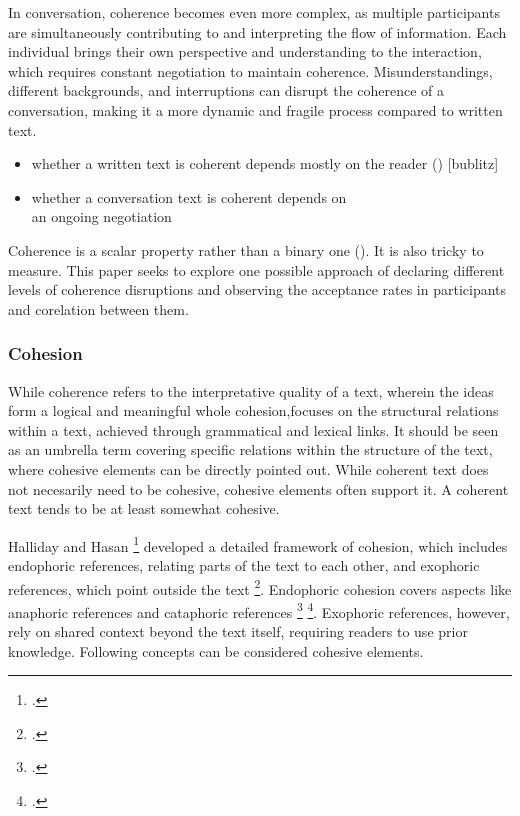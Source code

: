 \documentclass[12pt]{report}
\begin{document}
{\par
    In conversation, coherence becomes even more complex,
    as multiple participants are simultaneously contributing to and interpreting the flow of information.
    Each individual brings their own perspective and understanding to the interaction,
    which requires constant negotiation to maintain coherence.
    Misunderstandings, different backgrounds, and interruptions
    can disrupt the coherence of a conversation,
    making it a more dynamic and fragile process compared to written text.

\begin{itemize}
\item
whether a written text is coherent depends mostly on the reader () [bublitz]
\item
whether a conversation text is coherent depends on\\ an ongoing negotiation
\end{itemize}

\par
    Coherence is a scalar property rather than a binary one ().
    It is also tricky to measure.
    This paper seeks to explore one possible approach of
    declaring different levels of coherence disruptions
    and observing the acceptance rates in participants
    and corelation between them.

\subsubsection{Cohesion}
\par
    While coherence refers to the interpretative quality of a text,
    wherein the ideas form a logical and meaningful whole
    cohesion,focuses on the structural relations
    within a text, achieved through grammatical and lexical links.
    It should be seen as an umbrella term
    covering specific relations within
    the structure of the text,
    where cohesive elements can be directly pointed out.
    While coherent text does not necesarily need to be cohesive,
    cohesive elements often support it.
    A coherent text tends to be at least somewhat cohesive.

\par
    Halliday and Hasan \footcite{Halliday76cohesion} developed
    a detailed framework of cohesion, which includes
    endophoric references,
    relating parts of the text to each other, and
    exophoric references, which point outside the text \footcite[p.~31]{Halliday76cohesion}.
    Endophoric cohesion covers aspects
    like anaphoric references and cataphoric references \footcite{hajicovasgall2003} \footcite{loaiciga-etal-2022-anaphoric}.
    Exophoric references, however, rely on shared context beyond the text itself,
    requiring readers to use prior knowledge.
    Following concepts can be considered cohesive elements.

}
\end{document}
